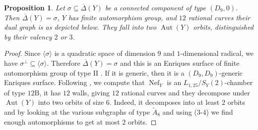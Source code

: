 \documentclass[a4paper]{amsart}
\theoremstyle{definition}
\theoremstyle{plain}
\newtheorem{proposition}[definition]{Proposition}
\DeclareMathOperator{\Nef}{Nef}
\DeclareMathOperator{\Aut}{Aut}
\newcommand{\DeltabarY}{\overline{\Delta}(Y)}
\begin{document}
\begin{proposition}\label{lemma:D9}
Let $\sigma \subseteq \DeltabarY$ be a connected component of type $(D_9, 0)$. 
Then $\DeltabarY=\sigma$, $Y$ has finite automorphism group, and $12$ rational curves their dual graph is as depicted below. They fall into two $\Aut(Y)$ orbits, distinguished by their valency $2$ or $3$. 
\end{proposition}
\begin{center}
\end{center}
\begin{proof}
Since $\langle \sigma \rangle$ is a quadratic space of dimension $9$ and $1$-dimensional radical, we have  $\sigma^\perp \subseteq \langle \sigma \rangle$. Therefore $\DeltabarY=\sigma$ and this is an Enriques surface of finite automorphism group of type \(\mathrm{II}\) \cite[Main Theorem]{kondo:enriques_finite_automorphism}. If it is generic, then it is a $(D_9,D_9)$-generic Enriques surface.
Following \cite[(7.4)]{brandhorst_shimada:tautaubar}, we compute that $\Nef_Y$ is an $L_{1,25}/S_Y(2)$-chamber 
of type $\mathrm{12B}$, it has $12$ walls, giving $12$ rational curves and they decompose under $\Aut(Y)$ into two orbits of size $6$. Indeed, it decomposes into at least $2$ orbits and by looking at the various subgraphs of type $\widetilde{A}_8$ and using (3-4) we find enough automorphisms to get at most $2$ orbits. 
\end{proof}
\end{document}
